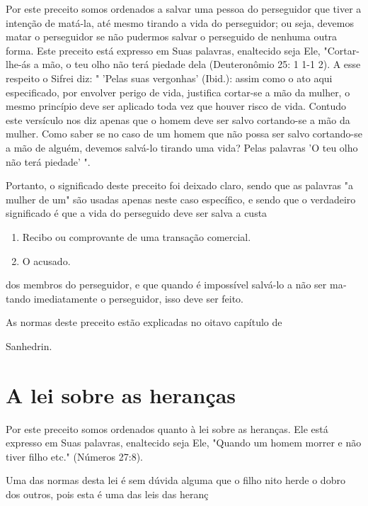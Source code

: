 \begin{itemize}
\begin{enumrate}
\begin{itemize}
\begin{itemize}
\begin{itemize}
Por este preceito somos ordenados a salvar uma pessoa do persegui­dor
que tiver a intenção de matá-la, até mesmo tirando a vida do
perseguidor; ou seja, devemos matar o perseguidor se não pudermos salvar
o perseguido de nenhuma outra forma. Este preceito está expresso em Suas
palavras, enalte­cido seja Ele, "Cortar-lhe-ás a mão, o teu olho não
terá piedade dela (Deutero­nômio 25: 1 1-1 2). A esse respeito o Sifrei
diz: " 'Pelas suas vergonhas' (Ibid.): assim como o ato aqui
especificado, por envolver perigo de vida, justifica cortar-se a mão da
mulher, o mesmo princípio deve ser aplicado toda vez que houver risco de
vida. Contudo este versículo nos diz apenas que o homem deve ser salvo
cortando-se a mão da mulher. Como saber se no caso de um homem que não
possa ser salvo cortando-se a mão de alguém, devemos salvá-lo tirando
uma vida? Pelas palavras 'O teu olho não terá piedade' ".

Portanto, o significado deste preceito foi deixado claro, sendo que as
palavras "a mulher de um" são usadas apenas neste caso específico, e
sendo que o verdadeiro significado é que a vida do perseguido deve ser
salva a custa


\begin{enumerate}
\def\labelenumi{\arabic{enumi}.}
\setcounter{enumi}{227}
\item
 
 Recibo ou comprovante de uma transação comercial.
 
\item
 
 O acusado.
 
\end{enumerate}

dos membros do perseguidor, e que quando é impossível salvá-lo a não ser
ma­tando imediatamente o perseguidor, isso deve ser feito.


As normas deste preceito estão explicadas no oitavo capítulo de


Sanhedrin.

\section{A lei sobre as heranças}

Por este preceito somos ordenados quanto à lei sobre as heranças. Ele
está expresso em Suas palavras, enaltecido seja Ele, "Quando um homem
morrer e não tiver filho etc." (Números 27:8).

Uma das normas desta lei é sem dúvida alguma que o filho nito herde o
dobro dos outros, pois esta é uma das leis das heranç


\end{itemize}
\end{itemize}
\end{itemize}
\end{enumrate}
\end{itemize}
